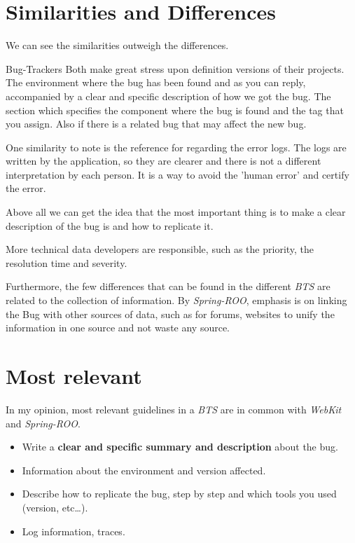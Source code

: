 \documentclass[11pt]{scrartcl}
\begin{document}

\section{Similarities and Differences}
\label{sec:similarities-and-differences}

\par We can see the similarities outweigh the differences.

\par Bug-Trackers Both make great stress upon definition versions of their projects. The environment where the bug has been found and as you can reply, accompanied by a clear and specific description of how we got the bug. The section which specifies the component where the bug is found and the tag that you assign.
Also if there is a related bug that may affect the new bug.

\par One similarity to note is the reference for regarding the error logs. The logs are written by the application, so they are clearer and there is not a different interpretation by each person. It is a way to avoid the 'human error' and certify the error.

\par Above all we can get the idea that the most important thing is to make a clear description of the bug is and how to replicate it.

\par More technical data developers are responsible, such as the priority, the resolution time and severity.

\par Furthermore, the few differences that can be found in the different \emph{BTS} are related to the collection of information. By \emph{Spring-ROO}, emphasis is on linking the Bug with other sources of data, such as for forums, websites to unify the information in one source and not waste any source.

\section{Most relevant}
\label{sec:most-relevant}

\par In my opinion, most relevant guidelines in a \emph{BTS} are in common with \emph{WebKit} and \emph{Spring-ROO}. 

\begin{itemize}
	\item Write a \textbf{clear and specific summary and description} about the bug.
	\item Information about the environment and version affected.
	\item Describe how to replicate the bug, step by step and which tools you used (version, etc\ldots).
	\item Log information, traces.
\end{itemize}
\end{document}
